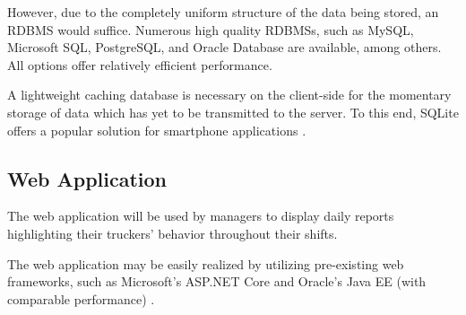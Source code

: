 However, due to the completely uniform structure of the data being stored, an RDBMS would suffice.
Numerous high quality RDBMSs, such as MySQL, Microsoft SQL, PostgreSQL, and Oracle Database are available, among others. All options offer relatively efficient performance.
\cite{truskowski2020comparison}

A lightweight caching database is necessary on the client-side for the momentary storage of data which has yet to be transmitted to the server. To this end, SQLite offers a popular solution for smartphone applications \cite{bhosale2015sqlite}.

\subsection{Web Application}
The web application will be used by managers to display daily reports highlighting their truckers' behavior throughout their shifts.

The web application may be easily realized by utilizing pre-existing web frameworks, such as Microsoft's ASP.NET Core and Oracle's Java EE (with comparable performance) \cite{kronis2018performance}.

\pagebreak
